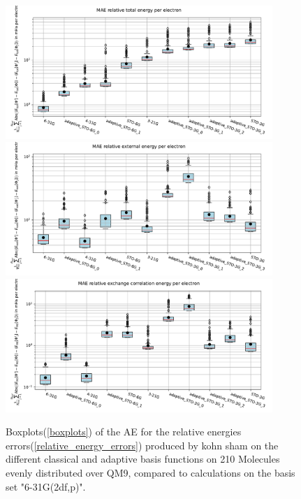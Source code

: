 \begin{figure}
    \centering
    \includegraphics[width=0.9\textwidth]{chapters/results/results_images/adaptive_basis_functions/relative_total_energy_adaptive_basis_sets}
    \includegraphics[width=0.9\textwidth]{chapters/results/results_images/adaptive_basis_functions/relative_coulomb_energy_adaptive_basis_sets}
    \includegraphics[width=0.9\textwidth]{chapters/results/results_images/adaptive_basis_functions/relative_exchange_correlation_energy_adaptive_basis_sets}
    \caption{Boxplots(\ref{boxplots}) of the AE for the relative energies errors(\eqref{relative_energy_errors}) produced by kohn sham on the different classical and adaptive basis functions on 210 Molecules evenly distributed over QM9, compared to calculations on the basis set "6-31G(2df,p)".}
    \label{fig:AE_relative_energies_adaptive_basis_sets}
\end{figure}

